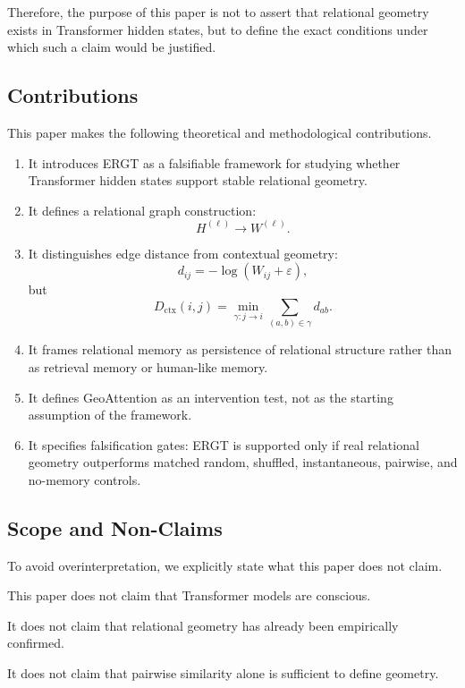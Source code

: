 \documentclass[11pt]{article}
\begin{document}
Therefore, the purpose of this paper is not to assert that relational geometry exists in Transformer hidden states, but to define the exact conditions under which such a claim would be justified.

\subsection{Contributions}

This paper makes the following theoretical and methodological contributions.

\begin{enumerate}[label=\textbf{C\arabic*.}, leftmargin=2.5em]
    \item It introduces ERGT as a falsifiable framework for studying whether Transformer hidden states support stable relational geometry.
    \item It defines a relational graph construction:
    \[
    H^{(\ell)}
    \rightarrow
    W^{(\ell)}.
    \]
    \item It distinguishes edge distance from contextual geometry:
    \[
    d_{ij}
    =
    -\log(W_{ij}+\varepsilon),
    \]
    but
    \[
    D_{\mathrm{ctx}}(i,j)
    =
    \min_{\gamma:j\to i}
    \sum_{(a,b)\in\gamma}d_{ab}.
    \]
    \item It frames relational memory as persistence of relational structure rather than as retrieval memory or human-like memory.
    \item It defines GeoAttention as an intervention test, not as the starting assumption of the framework.
    \item It specifies falsification gates: ERGT is supported only if real relational geometry outperforms matched random, shuffled, instantaneous, pairwise, and no-memory controls.
\end{enumerate}

\subsection{Scope and Non-Claims}

To avoid overinterpretation, we explicitly state what this paper does not claim.

This paper does not claim that Transformer models are conscious.

It does not claim that relational geometry has already been empirically confirmed.

It does not claim that pairwise similarity alone is sufficient to define geometry.
\end{document}
